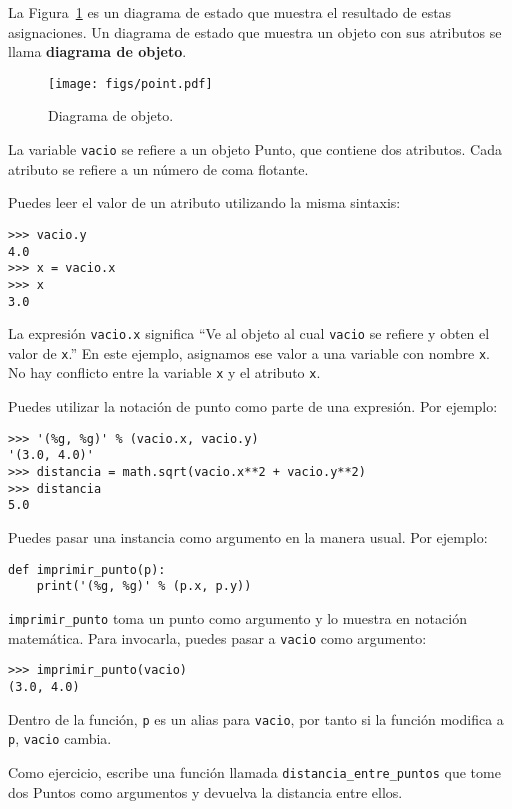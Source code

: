 \documentclass[10pt]{book}
\begin{document}
La Figura~\ref{fig.point} es un diagrama de estado que muestra el resultado de estas asignaciones.
Un diagrama de estado que muestra un objeto con sus atributos se
llama {\bf diagrama de objeto}.


\begin{figure}
\centerline
{\texttt{[image: figs/point.pdf]}}
\caption{Diagrama de objeto.}
\label{fig.point}
\end{figure}

La variable {\tt vacio} se refiere a un objeto Punto, que
contiene dos atributos.  Cada atributo se refiere a un
número de coma flotante.

Puedes leer el valor de un atributo utilizando la misma sintaxis:

\begin{verbatim}
>>> vacio.y
4.0
>>> x = vacio.x
>>> x
3.0
\end{verbatim}
%
La expresión {\tt vacio.x} significa ``Ve al objeto al cual {\tt vacio}
se refiere y obten el valor de {\tt x}.''  En este ejemplo, asignamos ese
valor a una variable con nombre {\tt x}.  No hay conflicto entre
la variable {\tt x} y el atributo {\tt x}.

Puedes utilizar la notación de punto como parte de una expresión.  Por ejemplo:

\begin{verbatim}
>>> '(%g, %g)' % (vacio.x, vacio.y)
'(3.0, 4.0)'
>>> distancia = math.sqrt(vacio.x**2 + vacio.y**2)
>>> distancia
5.0
\end{verbatim}
%
Puedes pasar una instancia como argumento en la manera usual.
Por ejemplo:

\begin{verbatim}
def imprimir_punto(p):
    print('(%g, %g)' % (p.x, p.y))
\end{verbatim}
%
\verb"imprimir_punto" toma un punto como argumento y lo muestra en
notación matemática.  Para invocarla, puedes pasar a {\tt vacio} como
argumento:

\begin{verbatim}
>>> imprimir_punto(vacio)
(3.0, 4.0)
\end{verbatim}
%
Dentro de la función, {\tt p} es un alias para {\tt vacio}, por tanto si
la función modifica a {\tt p}, {\tt vacio} cambia.

Como ejercicio, escribe una función llamada \verb"distancia_entre_puntos"
que tome dos Puntos como argumentos y devuelva la distancia entre
ellos.
\end{document}
